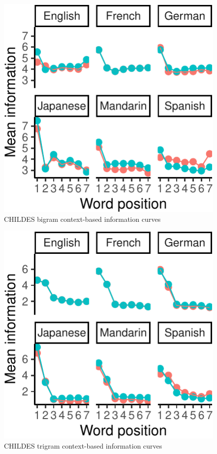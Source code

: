 \documentclass[man,floatsintext]{apa6}
\begin{document}
\begin{figure}
\centering
\includegraphics{figs/unnamed-chunk-2-1.pdf}
\caption{\label{fig:unnamed-chunk-2}CHILDES bigram context-based information curves}
\end{figure}

\begin{figure}
\centering
\includegraphics{figs/unnamed-chunk-3-1.pdf}
\caption{\label{fig:unnamed-chunk-3}CHILDES trigram context-based information curves}
\end{figure}
\end{document}
